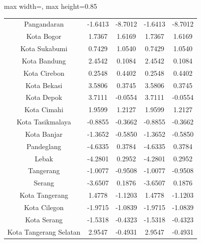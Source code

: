 \begin{table}[H]
\begin{adjustbox}{max width=\textwidth, max height=0.85\textheight}
\begin{tabular}{|c|c|c|c|c|}
Pangandaran & -1.6413 & -8.7012 & -1.6413 & -8.7012 \\
Kota Bogor & 1.7367 & 1.6169 & 1.7367 & 1.6169 \\
Kota Sukabumi & 0.7429 & 1.0540 & 0.7429 & 1.0540 \\
Kota Bandung & 2.4542 & 0.1084 & 2.4542 & 0.1084 \\
Kota Cirebon & 0.2548 & 0.4402 & 0.2548 & 0.4402 \\
Kota Bekasi & 3.5806 & 0.3745 & 3.5806 & 0.3745 \\
Kota Depok & 3.7111 & -0.0554 & 3.7111 & -0.0554 \\
Kota Cimahi & 1.9599 & 1.2127 & 1.9599 & 1.2127 \\
Kota Tasikmalaya & -0.8855 & -0.3662 & -0.8855 & -0.3662 \\
Kota Banjar & -1.3652 & -0.5850 & -1.3652 & -0.5850 \\
Pandeglang & -4.6335 & 0.3784 & -4.6335 & 0.3784 \\
Lebak & -4.2801 & 0.2952 & -4.2801 & 0.2952 \\
Tangerang & -1.0077 & -0.9508 & -1.0077 & -0.9508 \\
Serang & -3.6507 & 0.1876 & -3.6507 & 0.1876 \\
Kota Tangerang & 1.4778 & -1.1203 & 1.4778 & -1.1203 \\
Kota Cilegon & -1.9715 & -1.0839 & -1.9715 & -1.0839 \\
Kota Serang & -1.5318 & -0.4323 & -1.5318 & -0.4323 \\
Kota Tangerang Selatan & 2.9547 & -0.4931 & 2.9547 & -0.4931 \\
\hline
\end{tabular}
\end{adjustbox}
\end{table}